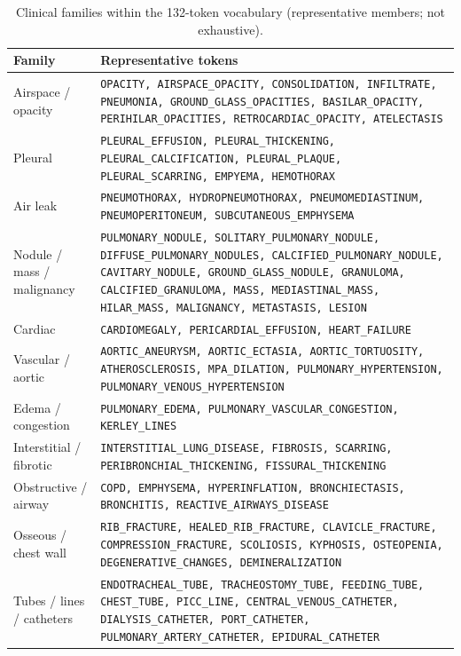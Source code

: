 \documentclass[11pt,a4paper]{article}
\begin{document}
\begin{table}[H]
\centering\footnotesize
\caption{Clinical families within the 132-token vocabulary (representative members; not exhaustive).}
\label{tab:taxonomy}
\begin{tabularx}{\textwidth}{L L}
\toprule
\textbf{Family} & \textbf{Representative tokens} \\
\midrule
Airspace / opacity & \texttt{OPACITY, AIRSPACE\_OPACITY, CONSOLIDATION, INFILTRATE, PNEUMONIA, GROUND\_GLASS\_OPACITIES, BASILAR\_OPACITY, PERIHILAR\_OPACITIES, RETROCARDIAC\_OPACITY, ATELECTASIS} \\
Pleural & \texttt{PLEURAL\_EFFUSION, PLEURAL\_THICKENING, PLEURAL\_CALCIFICATION, PLEURAL\_PLAQUE, PLEURAL\_SCARRING, EMPYEMA, HEMOTHORAX} \\
Air leak & \texttt{PNEUMOTHORAX, HYDROPNEUMOTHORAX, PNEUMOMEDIASTINUM, PNEUMOPERITONEUM, SUBCUTANEOUS\_EMPHYSEMA} \\
Nodule / mass / malignancy & \texttt{PULMONARY\_NODULE, SOLITARY\_PULMONARY\_NODULE, DIFFUSE\_PULMONARY\_NODULES, CALCIFIED\_PULMONARY\_NODULE, CAVITARY\_NODULE, GROUND\_GLASS\_NODULE, GRANULOMA, CALCIFIED\_GRANULOMA, MASS, MEDIASTINAL\_MASS, HILAR\_MASS, MALIGNANCY, METASTASIS, LESION} \\
Cardiac & \texttt{CARDIOMEGALY, PERICARDIAL\_EFFUSION, HEART\_FAILURE} \\
Vascular / aortic & \texttt{AORTIC\_ANEURYSM, AORTIC\_ECTASIA, AORTIC\_TORTUOSITY, ATHEROSCLEROSIS, MPA\_DILATION, PULMONARY\_HYPERTENSION, PULMONARY\_VENOUS\_HYPERTENSION} \\
Edema / congestion & \texttt{PULMONARY\_EDEMA, PULMONARY\_VASCULAR\_CONGESTION, KERLEY\_LINES} \\
Interstitial / fibrotic & \texttt{INTERSTITIAL\_LUNG\_DISEASE, FIBROSIS, SCARRING, PERIBRONCHIAL\_THICKENING, FISSURAL\_THICKENING} \\
Obstructive / airway & \texttt{COPD, EMPHYSEMA, HYPERINFLATION, BRONCHIECTASIS, BRONCHITIS, REACTIVE\_AIRWAYS\_DISEASE} \\
Osseous / chest wall & \texttt{RIB\_FRACTURE, HEALED\_RIB\_FRACTURE, CLAVICLE\_FRACTURE, COMPRESSION\_FRACTURE, SCOLIOSIS, KYPHOSIS, OSTEOPENIA, DEGENERATIVE\_CHANGES, DEMINERALIZATION} \\
Tubes / lines / catheters & \texttt{ENDOTRACHEAL\_TUBE, TRACHEOSTOMY\_TUBE, FEEDING\_TUBE, CHEST\_TUBE, PICC\_LINE, CENTRAL\_VENOUS\_CATHETER, DIALYSIS\_CATHETER, PORT\_CATHETER, PULMONARY\_ARTERY\_CATHETER, EPIDURAL\_CATHETER} \\

\end{tabularx}
\end{table}
\end{document}
